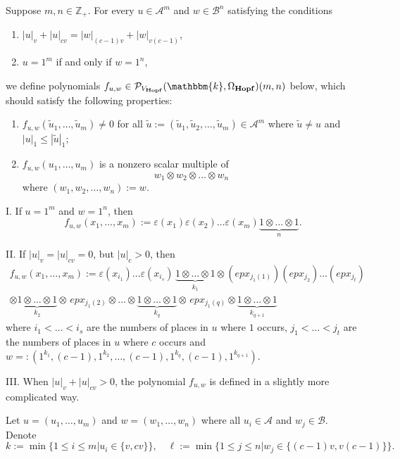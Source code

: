 \documentclass[12pt, reqno, a4paper]{amsart}
\theoremstyle{plain}
\theoremstyle{remark}
\theoremstyle{definition}
\numberwithin{equation}{section}
\begin{document}
  Suppose $m,n \in \mathbb Z_+$. For every $u\in\mathcal A^m$ and $w\in\mathcal B^n$
  satisfying the conditions
  \begin{enumerate}
  	\item  $|u|_v + |u|_{cv} =  |w|_{(c-1)v} + |w|_{v(c-1)}$, 
  	\item $u=1^m$ if and only if $w=1^n$,
  \end{enumerate}
  we define polynomials $f_{u,w}\in \mathcal P_{V_{\mathbf{Hopf}}}(\mathbbm{k}, \Omega_\mathbf{Hopf})(m,n)$ below,
  which should satisfy the following properties:  \begin{enumerate}
  	\item  $f_{u, w}(\tilde u_1, \ldots, \tilde u_m)\ne 0$
  for all $\tilde u := (\tilde u_1, \tilde u_2,\ldots, \tilde u_m) \in \mathcal A^m$
  where $\tilde u \ne u$ and $|u|_1 \leqslant |\tilde u|_1$;
  \item  $f_{u, w}(u_1, \ldots, u_m)$ is a nonzero scalar multiple of $$w_1 \otimes w_2 \otimes\dots\otimes w_n$$
  where $(w_1, w_2,\ldots, w_n):=w$.
\end{enumerate}
  
  I. If $u=1^m$ and $w=1^n$,
  then $$f_{u,w}(x_1, \ldots, x_m):= \varepsilon(x_1)\varepsilon(x_2)\ldots \varepsilon(x_m) \underbrace{1\otimes \dots \otimes 1}_n.$$
  
  II. If $|u|_v = |u|_{cv}=0$, but $|u|_c > 0$, then 
\begin{equation*}\begin{split}f_{u,w}(x_1, \ldots, x_m) := \varepsilon(x_{i_1}) \ldots \varepsilon(x_{i_s})
\,\underbrace{1 \otimes \dots \otimes 1}_{k_1} \otimes (epx_{j_1(1)}) (epx_{j_2}) \ldots (epx_{j_t}) \\
\otimes \underbrace{1 \otimes \dots \otimes 1}_{k_2} \otimes\, epx_{j_1(2)} \otimes
\dots 
\otimes \underbrace{1 \otimes \dots \otimes 1}_{k_q} \otimes\, epx_{j_1(q)} \otimes \underbrace{1 \otimes \dots \otimes 1}_{k_{q+1}}
\end{split}
\end{equation*}
where $i_1< \ldots< i_s$ are the numbers of places in $u$ where $1$ occurs, $j_1 < \ldots < j_t$ are 
the numbers of places in $u$ where $c$ occurs and $w=:(1^{k_1},(c-1),1^{k_2},\ldots,(c-1),1^{k_q},(c-1),1^{k_{q+1}})$.

III. When $|u|_v + |u|_{cv} > 0$, the polynomial $f_{u,w}$ is defined in a slightly more complicated way.

  Let $u=(u_1, \ldots, u_m)$ and $w=(w_1, \ldots, w_n)$ where all $u_i\in\mathcal A$
and $w_j \in \mathcal B$. Denote $$k:= \min \bigl\lbrace 1\leqslant i \leqslant m \mathrel{\bigl|}
u_i \in \lbrace v,cv \rbrace \bigr\rbrace,\quad  
\ell:= \min \bigl\lbrace 1\leqslant j \leqslant n \mathrel{\bigl|}
w_j \in \lbrace (c-1)v, v(c-1) \rbrace \bigr\rbrace.$$
\end{document}
